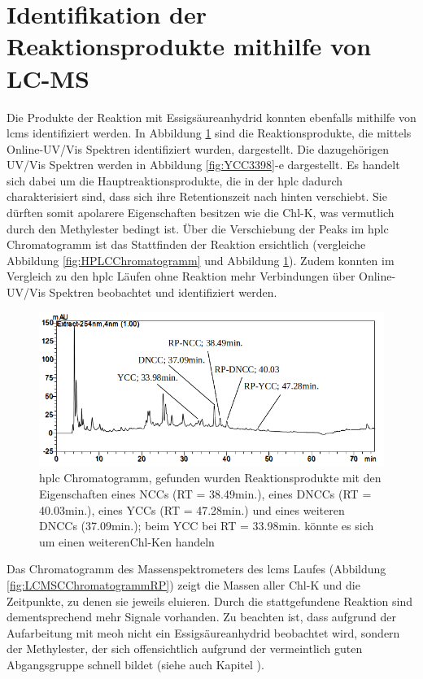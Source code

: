 \pagebreak
\section{Identifikation der Reaktionsprodukte mithilfe von LC-MS}

Die Produkte der Reaktion mit Essigsäureanhydrid konnten ebenfalls mithilfe von \gls{lcms} identifiziert werden. In Abbildung \ref{fig:HPLCChromatogrammRP} sind die Reaktionsprodukte, die mittels Online-UV/Vis Spektren identifiziert wurden, dargestellt. Die dazugehörigen UV/Vis Spektren werden in Abbildung \ref{fig:YCC3398}-e dargestellt. Es handelt sich dabei um die Hauptreaktionsprodukte, die in der \gls{hplc} dadurch charakterisiert sind, dass sich ihre Retentionszeit nach hinten verschiebt. Sie dürften somit apolarere Eigenschaften besitzen wie die \gls{Chl-K}, was vermutlich durch den Methylester bedingt ist. Über die Verschiebung der Peaks im \gls{hplc} Chromatogramm ist das Stattfinden der Reaktion ersichtlich (vergleiche Abbildung \ref{fig:HPLCChromatogramm} und Abbildung \ref{fig:HPLCChromatogrammRP}). Zudem konnten im Vergleich zu den \gls{hplc} Läufen ohne Reaktion mehr Verbindungen über Online-UV/Vis Spektren beobachtet und identifiziert werden.

\begin{figure}[!htbp]
  \includegraphics[width=\textwidth]{figures/Kapitel6/Reaktion3h/HPLC_Chromatogramm.png}
  \caption[HPLC Chromatogramm nach 3h Reaktionsdauer, Quelle: Author]{\gls{hplc} Chromatogramm, gefunden wurden Reaktionsprodukte mit den Eigenschaften eines NCCs (RT = 38.49min.), eines DNCCs (RT = 40.03min.), eines YCCs (RT = 47.28min.) und eines weiteren DNCCs (37.09min.); beim YCC bei RT = 33.98min. könnte es sich um einen weiteren\gls{Chl-K}en handeln}
  \label{fig:HPLCChromatogrammRP}
\end{figure}

Das Chromatogramm des Massenspektrometers des \gls{lcms} Laufes (Abbildung \ref{fig:LCMSCChromatogrammRP}) zeigt die Massen aller \gls{Chl-K} und die Zeitpunkte, zu denen sie jeweils eluieren. Durch die stattgefundene Reaktion sind dementsprechend mehr Signale vorhanden. Zu beachten ist, dass aufgrund der Aufarbeitung mit \gls{meoh} nicht ein Essigsäureanhydrid beobachtet wird, sondern der Methylester, der sich offensichtlich aufgrund der vermeintlich guten Abgangsgruppe  schnell bildet (siehe auch Kapitel ). \\

